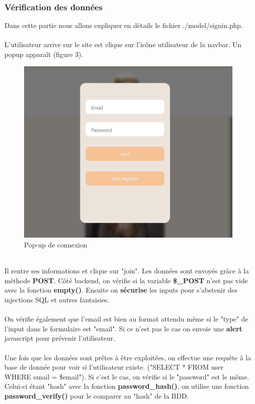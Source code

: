 \documentclass{article}
\begin{document}
\subsubsection{Vérification des données}
Dans cette partie nous allons expliquer en détails le fichier ./model/signin.php.\\\\
L'utilisateur arrive sur le site est clique sur l'icône utilisateur de la navbar. Un popup apparaît (figure 3).
\begin{figure}[h]\centering
\includegraphics[width=\textwidth]{popup}
\caption{Pop-up de connexion}
\end{figure}\\
Il rentre ses informations et clique sur "join". Les données sont envoyés grâce à la méthode \textbf{POST}. Côté backend, on vérifie si la variable \textbf{\$\_POST} n'est pas vide avec la fonction \textbf{empty()}. Ensuite on \textbf{sécurise} les inputs pour s'abstenir des injections SQL et autres fantaisies.\\\\
On vérifie également que l'email est bien au format attendu même si le "type" de l'input dans le formulaire est "email". Si ce n'est pas le cas on envoie une \textbf{alert} javascript pour prévenir l'utilisateur.\\\\
Une fois que les données sont prêtes à  être exploitées, on effectue une requête à la base de donnée pour voir si l'utilisateur existe. ("SELECT * FROM user WHERE email = \$email"). Si c'est le cas, on vérifie si le "password" est le même. Celui-ci étant "hash" avec la fonction \textbf{password\_hash()}, on utilise une fonction  \textbf{password\_verify()} pour le comparer au "hash" de la BDD.\\\\
\end{document}

